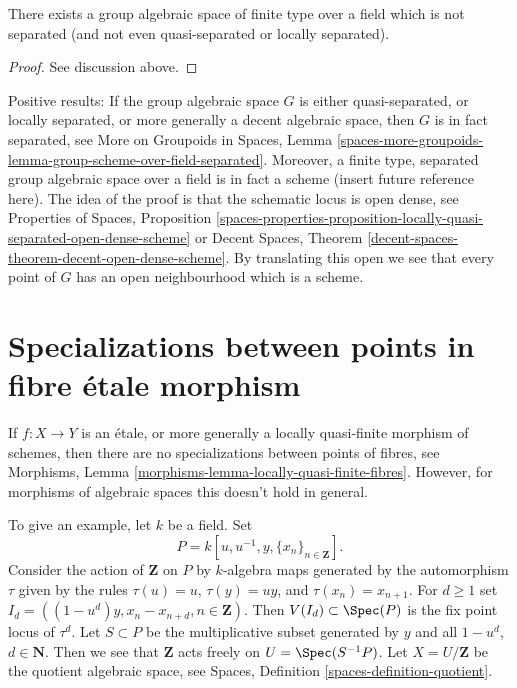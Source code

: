 \begin{lemma}
\label{lemma-non-separated-group-space}
There exists a group algebraic space of finite type over a field
which is not separated (and not even quasi-separated or locally separated).
\end{lemma}

\begin{proof}
See discussion above.
\end{proof}

\noindent
Positive results: If the group algebraic space $G$ is either
quasi-separated, or locally separated, or more generally a
decent algebraic space, then $G$ is in fact separated, see
More on Groupoids in Spaces, Lemma
\ref{spaces-more-groupoids-lemma-group-scheme-over-field-separated}.
Moreover, a finite type, separated group algebraic space over a
field is in fact a scheme (insert future reference here). The idea
of the proof is that the schematic locus is open dense, see
Properties of Spaces, Proposition
\ref{spaces-properties-proposition-locally-quasi-separated-open-dense-scheme}
or
Decent Spaces, Theorem \ref{decent-spaces-theorem-decent-open-dense-scheme}.
By translating this open we see that
every point of $G$ has an open neighbourhood which is a scheme.




\section{Specializations between points in fibre \'etale morphism}
\label{section-specializations-fibre-etale}

\noindent
If $f : X \to Y$ is an \'etale, or more generally a locally quasi-finite
morphism of schemes, then there are no specializations between points of
fibres, see
Morphisms, Lemma \ref{morphisms-lemma-locally-quasi-finite-fibres}.
However, for morphisms of algebraic spaces this doesn't hold in general.

\medskip\noindent
To give an example, let $k$ be a field.
Set
$$
P = k[u, u^{-1}, y, \{x_n\}_{n \in \mathbf{Z}}].
$$
Consider the action
of $\mathbf{Z}$ on $P$ by $k$-algebra maps generated by the automorphism
$\tau$ given by the rules $\tau(u) = u$, $\tau(y) = uy$, and
$\tau(x_n) = x_{n + 1}$. For $d \geq 1$ set
$I_d = ((1 - u^d)y, x_n - x_{n + d}, n \in \mathbf{Z})$.
Then $V(I_d) \subset \Spec(P)$ is the fix point locus of $\tau^d$.
Let $S \subset P$ be the multiplicative subset generated by $y$ and
all $1 - u^d$, $d \in \mathbf{N}$. Then we
see that $\mathbf{Z}$ acts freely on $U = \Spec(S^{-1}P)$.
Let $X = U/\mathbf{Z}$ be the quotient algebraic space, see
Spaces, Definition \ref{spaces-definition-quotient}.


